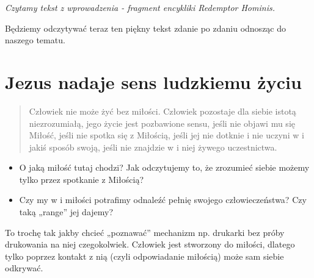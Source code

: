 \documentclass[a5paper,10pt,polish]{book}
\begin{document}
\emph{Czytamy tekst z wprowadzenia - fragment encykliki Redemptor Hominis.}

Będziemy odczytywać teraz ten piękny tekst zdanie po zdaniu odnosząc do naszego tematu.


\section{Jezus nadaje sens ludzkiemu życiu}
\label{babice2006-wiosna-knurow/spotkanie2:jezus-nadaje-sens-ludzkiemu-zyciu}\begin{quote}

Człowiek nie może żyć bez miłości. Człowiek pozostaje dla siebie istotą niezrozumiałą, jego życie jest pozbawione sensu, jeśli nie objawi mu się Miłość, jeśli  nie spotka się  z Miłością, jeśli  jej nie dotknie i nie uczyni w i jakiś sposób swoją, jeśli nie znajdzie w i niej żywego uczestnictwa.
\end{quote}
\begin{itemize}
\item {} 
O jaką miłość tutaj chodzi? Jak odczytujemy to, że zrozumieć siebie możemy tylko przez spotkanie z Miłością?

\item {} 
Czy my w i miłości potrafimy odnaleźć pełnię swojego człowieczeństwa?  Czy taką „range” jej dajemy?

\end{itemize}

To trochę tak jakby chcieć „poznawać”  mechanizm np. drukarki  bez próby drukowania na niej czegokolwiek. Człowiek jest stworzony do miłości, dlatego tylko poprzez kontakt z nią (czyli odpowiadanie miłością) może sam siebie odkrywać.
\end{document}
